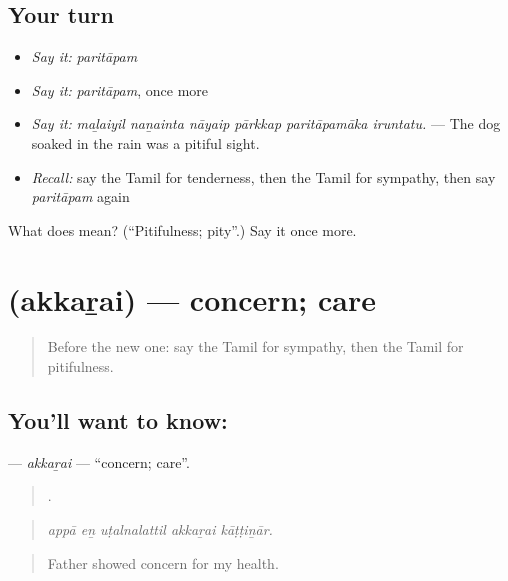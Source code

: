 \subsection*{Your turn}
\begin{itemize}
\raggedright
  \item \emph{Say it:} \emph{paritāpam}
  \item \emph{Say it:} \emph{paritāpam}, once more
  \item \emph{Say it:} \emph{maḻaiyil naṉainta nāyaip pārkkap paritāpamāka iruntatu.} — The dog soaked in the rain was a pitiful sight.
  \item \emph{Recall:} say the Tamil for tenderness, then the Tamil for sympathy, then say \emph{paritāpam} again
\end{itemize}

\begin{tcolorbox}[breakable,colback=teal!4,colframe=teal!35!black,title={Before you move on}]
What does  mean? (\textquotedblleft{}Pitifulness; pity\textquotedblright{}.) Say it once more.
\end{tcolorbox}
\section[\texorpdfstring{\ta{அக்கறை} (akkaṟai)}{அக்கறை (akkaṟai)}]{ (akkaṟai) — concern; care}

\label{lesson:TA-C457-akkarai}



\begin{quote}
Before the new one: say the Tamil for sympathy, then the Tamil for pitifulness.
\end{quote}

\subsection*{You'll want to know: }
\textbf{} — \emph{akkaṟai} — \textquotedblleft{}concern; care\textquotedblright{}.

\begin{quote}
    .
\end{quote}

\begin{quote}
\emph{appā eṉ uṭalnalattil akkaṟai kāṭṭiṉār.}
\end{quote}

\begin{quote}
Father showed concern for my health.
\end{quote}

